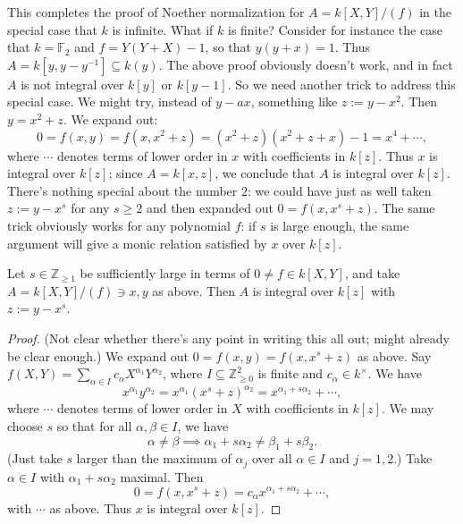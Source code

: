 \documentclass[10pt]{article}
\begin{document}
This completes the proof of Noether normalization for
\(A = k[X,Y]/(f)\) in the special case that \(k\) is infinite.  What
if \(k\) is finite?
Consider for instance the case that \(k = \mathbb{F}_2\)
and
\(f = Y(Y+ X)- 1\),
so that \(y (y+x) = 1\).
Thus \(A = k[y, y - y^{-1}] \subseteq k(y)\).
The above proof obviously doesn't work, and
in fact \(A\) is not integral over \(k[y]\) or \(k[y-1]\).
So we
need another trick to address this special case.
We might try, instead of \(y - a x\),
something like \(z := y - x^2\).
Then \(y = x^2 + z\).
We expand out:
\[0 =
    f(x,y)
    = f(x,x^2 + z)
    = (x^2 + z)(x^2 + z + x) - 1
    = x^4 + \dotsb,
  \]
where \(\dotsb\) denotes terms
of lower order in \(x\) with coefficients in \(k[z]\).
Thus \(x\) is integral over \(k[z]\);
since \(A = k[x,z]\),
we conclude that \(A\) is integral over \(k[z]\).
There's nothing special  about the number \(2\):
we could have just as well taken \(z := y - x^s\) for any \(s \geq 2\)
and then expanded out \(0 = f(x, x^s + z)\).
The same trick obviously works for any polynomial \(f\):
if \(s\) is large enough, the same argument will give a monic relation satisfied
by \(x\) over \(k[z]\).
\begin{lemma}
  Let $s \in \mathbb{Z}_{\geq 1}$ be sufficiently large in terms
  of $0 \neq f  \in k[X,Y]$,
  and take
  $A = k[X,Y]/(f)\ni x,y$ as above.
  Then $A$ is integral over $k[z]$ with $z := y - x^s$.
\end{lemma}
\begin{proof}
  (Not clear whether there's any point in writing this all out; might already be clear enough.)
  We expand out $0 = f(x,y) = f(x,x^s+z)$ as above.
  Say $f(X,Y) = \sum_{\alpha \in I} c_\alpha X^{\alpha_1}
  Y^{\alpha_2}$,
  where $I \subseteq \mathbb{Z}_{\geq 0}^2$ is finite and
  $c_\alpha \in k^\times$.
  We have
  \[
    x^{\alpha_1} y^{\alpha_2} = x^{\alpha_1} (x^s +
    z)^{\alpha_2}
    = x^{\alpha_1 + s \alpha_2} + \dotsb,
  \]
  where $\dotsb$ denotes terms of lower order in $X$ with
  coefficients in $k[z]$.
  We may choose $s$ so that for all $\alpha, \beta \in I$,
  we have
  \[
    \alpha \neq \beta \implies \alpha_1 + s \alpha_2 \neq \beta_1 + s \beta _2.
  \]
  (Just take $s$ larger than the maximum of $\alpha_j$ over all
  $\alpha \in I$ and $j = 1,2$.)
  Take $\alpha \in I$
  with $\alpha_1 + s \alpha_2$ maximal.
  Then
  \[
    0 = f(x,x^s + z)
    = c_\alpha x^{\alpha_1 + s \alpha_2} + \dotsb,
  \]
  with $\dotsb$ as above.
  Thus $x$ is integral over $k[z]$.
\end{proof}
\end{document}
